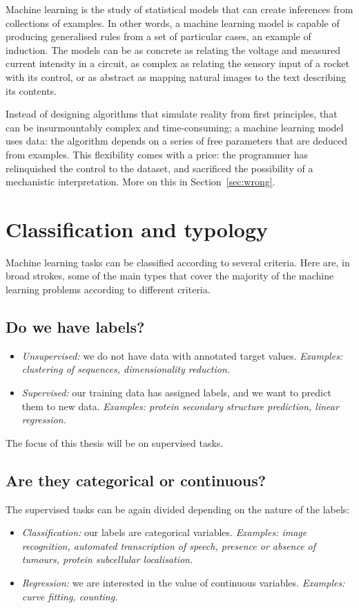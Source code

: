 
Machine learning is the study of statistical models that can create inferences from collections of examples. 
In other words, a machine learning model is capable of producing generalised rules from a set of particular cases, an example of induction.
The models can be as concrete as relating the voltage and measured current intensity in a circuit, as complex as relating the sensory input of a rocket with its control, or as abstract as mapping natural images to the text describing its contents.

Instead of designing algorithms that simulate reality from first principles, that can be insurmountably complex and time-consuming; a machine learning model uses data: the algorithm depends on a series of free parameters that are deduced from examples.
This flexibility comes with a price: the programmer has relinquished the control to the dataset, and sacrificed the possibility of a mechanistic interpretation.
More on this in Section~\ref{sec:wrong}.

\section{Classification and typology}
Machine learning tasks can be classified according to several criteria.
Here are, in broad strokes, some of the main types that cover the majority of the machine learning problems according to different criteria.

\subsection{Do we have labels?}
\begin{itemize}
\item \emph{Unsupervised:} we do not have data with annotated target values. \emph{Examples: clustering of \DNA{} sequences, dimensionality reduction.}
\item \emph{Supervised:} our training data has assigned labels, and we want to predict them to new data. \emph{Examples: protein secondary structure prediction, linear regression.}
\end{itemize}

The focus of this thesis will be on supervised tasks.

\subsection[Categorical or continuous?]{Are they categorical or continuous?}
The supervised tasks can be again divided depending on the nature of the labels:
\begin{itemize}
\item \emph{Classification:} our labels are categorical variables. \emph{Examples: image recognition, automated transcription of speech, presence or absence of tumours, protein subcellular localisation.}
\item \emph{Regression:} we are interested in the value of continuous variables. \emph{Examples: curve fitting, counting.}
\end{itemize}


